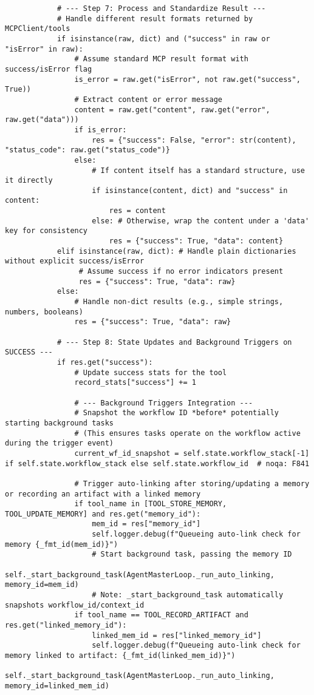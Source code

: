 \documentclass[12pt,a4paper]{article}
\begin{document}
\begin{pageablecode}
\begin{verbatim}
            # --- Step 7: Process and Standardize Result ---
            # Handle different result formats returned by MCPClient/tools
            if isinstance(raw, dict) and ("success" in raw or "isError" in raw):
                # Assume standard MCP result format with success/isError flag
                is_error = raw.get("isError", not raw.get("success", True))
                # Extract content or error message
                content = raw.get("content", raw.get("error", raw.get("data")))
                if is_error:
                    res = {"success": False, "error": str(content), "status_code": raw.get("status_code")}
                else:
                    # If content itself has a standard structure, use it directly
                    if isinstance(content, dict) and "success" in content:
                        res = content
                    else: # Otherwise, wrap the content under a 'data' key for consistency
                        res = {"success": True, "data": content}
            elif isinstance(raw, dict): # Handle plain dictionaries without explicit success/isError
                 # Assume success if no error indicators present
                 res = {"success": True, "data": raw}
            else:
                # Handle non-dict results (e.g., simple strings, numbers, booleans)
                res = {"success": True, "data": raw}

            # --- Step 8: State Updates and Background Triggers on SUCCESS ---
            if res.get("success"):
                # Update success stats for the tool
                record_stats["success"] += 1

                # --- Background Triggers Integration ---
                # Snapshot the workflow ID *before* potentially starting background tasks
                # (This ensures tasks operate on the workflow active during the trigger event)
                current_wf_id_snapshot = self.state.workflow_stack[-1] if self.state.workflow_stack else self.state.workflow_id  # noqa: F841

                # Trigger auto-linking after storing/updating a memory or recording an artifact with a linked memory
                if tool_name in [TOOL_STORE_MEMORY, TOOL_UPDATE_MEMORY] and res.get("memory_id"):
                    mem_id = res["memory_id"]
                    self.logger.debug(f"Queueing auto-link check for memory {_fmt_id(mem_id)}")
                    # Start background task, passing the memory ID
                    self._start_background_task(AgentMasterLoop._run_auto_linking, memory_id=mem_id)
                    # Note: _start_background_task automatically snapshots workflow_id/context_id
                if tool_name == TOOL_RECORD_ARTIFACT and res.get("linked_memory_id"):
                    linked_mem_id = res["linked_memory_id"]
                    self.logger.debug(f"Queueing auto-link check for memory linked to artifact: {_fmt_id(linked_mem_id)}")
                    self._start_background_task(AgentMasterLoop._run_auto_linking, memory_id=linked_mem_id)


\end{verbatim}
\end{pageablecode}
\end{document}
